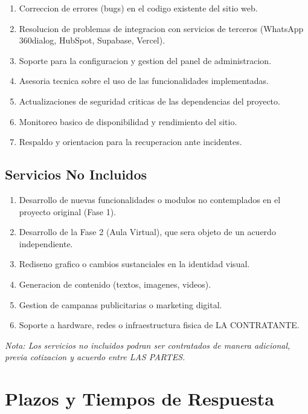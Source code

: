 \documentclass[12pt,a4paper]{article}
\begin{document}
\begin{enumerate}[label=\textbf{\alph*)}, leftmargin=2em, itemsep=0.3em]
  \item Correccion de errores (bugs) en el codigo existente del sitio web.
  \item Resolucion de problemas de integracion con servicios de terceros (WhatsApp 360dialog, HubSpot, Supabase, Vercel).
  \item Soporte para la configuracion y gestion del panel de administracion.
  \item Asesoria tecnica sobre el uso de las funcionalidades implementadas.
  \item Actualizaciones de seguridad criticas de las dependencias del proyecto.
  \item Monitoreo basico de disponibilidad y rendimiento del sitio.
  \item Respaldo y orientacion para la recuperacion ante incidentes.
\end{enumerate}

\subsection{Servicios No Incluidos}

\begin{enumerate}[label=\textbf{\alph*)}, leftmargin=2em, itemsep=0.3em]
  \item Desarrollo de nuevas funcionalidades o modulos no contemplados en el proyecto original (Fase 1).
  \item Desarrollo de la Fase 2 (Aula Virtual), que sera objeto de un acuerdo independiente.
  \item Rediseno grafico o cambios sustanciales en la identidad visual.
  \item Generacion de contenido (textos, imagenes, videos).
  \item Gestion de campanas publicitarias o marketing digital.
  \item Soporte a hardware, redes o infraestructura fisica de LA CONTRATANTE.
\end{enumerate}

\textit{\color{graytext}Nota: Los servicios no incluidos podran ser contratados de manera adicional, previa cotizacion y acuerdo entre LAS PARTES.}

\section{Plazos y Tiempos de Respuesta}
\end{document}
